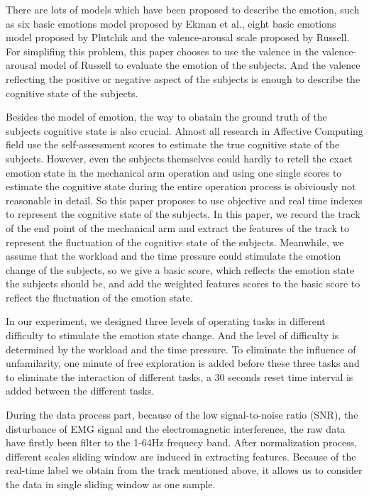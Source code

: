 \documentclass[runningheads,a4paper]{llncs}
\begin{document}
There are lots of models which have been proposed to describe the emotion, such as
six basic emotions model proposed by Ekman et al.\cite{Ekman}, eight basic emotions
model proposed by Plutchik\cite{Plutchik} and the valence-arousal scale proposed
by Russell\cite{Russell}. For simplifing this problem, this paper chooses to use the
valence in the valence-arousal model of Russell to evaluate the emotion of the subjects.
And the valence reflecting the positive or negative aspect of the subjects is enough
to describe the cognitive state of the subjects.


Besides the model of emotion, the way to obatain the ground truth of the subjects cognitive state
is also crucial. Almost all research in Affective Computing field use the self-assessment
scores to estimate the true cognitive state of the subjects. However, even the subjects
themselves could hardly to retell the exact emotion state in the mechanical arm operation
and using one single scores to estimate the cognitive state during the entire operation process
 is obiviously not reasonable in detail. So this paper proposes to use objective and real time
 indexes to represent the cognitive state of the subjects. In this paper, we record the track
 of the end point of the mechanical arm and extract the features of the track to represent
 the fluctuation of the cognitive state of the subjects. Meanwhile, we assume that the workload
  and the time pressure could stimulate the emotion change of the subjects, so we give a
  basic score, which reflects the emotion state the subjects should be, and add the weighted
  features scores to the basic score to reflect the fluctuation of the emotion state.


In our experiment, we designed three levels of operating tasks in different difficulty to
  stimulate the emotion state change. And the level of difficulty is determined by the
  workload and the time pressure. To eliminate the influence of unfamilarity, one minute
  of free exploration is added before these three tasks and to eliminate the interaction
  of different tasks, a 30 seconds reset time interval is added between the different
  tasks.


During the data process part, because of the low signal-to-noise ratio (SNR),
the disturbance of EMG signal and the electromagnetic interference, the raw data
have firstly been filter to the 1-64Hz frequecy band\cite{Feature}. After normalization
process, different scales sliding window are induced in extracting features. Because of
the real-time label we obtain from the track mentioned above, it allows us to consider the
data in single sliding window as one sample.
\end{document}
